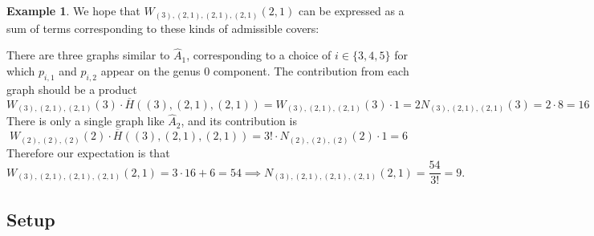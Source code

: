 \documentclass[11pt]{article}           %
\theoremstyle{definition}
\newtheorem{eg}{Example}[section]
\begin{document}
\begin{eg}

                                    We hope that $W_{(3),(2,1),(2,1),(2,1)}(2,1)$ can be expressed
                                    as a sum of terms corresponding to these kinds of
                                    admissible covers:

                                    There are three graphs similar to $\hat A_1$, corresponding to a choice of $i\in\{3,4,5\}$ for which $p_{i,1}$ and $p_{i,2}$ appear on the genus $0$ component. The contribution from each graph should be a product
                                    \[
                                    W_{(3),(2,1),(2,1)}(3)\cdot \overline H((3),(2,1),(2,1))=W_{(3),(2,1),(2,1)}(3)\cdot 1=2N_{(3),(2,1),(2,1)}(3)=2\cdot 8=16
                                    \]
                                    There is only a single graph like $\hat A_2$,
                                    and its contribution is
                                    \[
                                    W_{(2),(2),(2)}(2)\cdot \overline H((3),(2,1),(2,1))=3!\cdot N_{(2),(2),(2)}(2)\cdot 1=6
                                    \]
                                    Therefore our expectation is that
                                    \[
                                    W_{(3),(2,1),(2,1),(2,1)}(2,1)=3\cdot 16+6=54\implies N_{(3),(2,1),(2,1),(2,1)}(2,1)=\frac{54}{3!}=9.
                                    \]
  \end{eg}

                \subsection{Setup}
\end{document}
